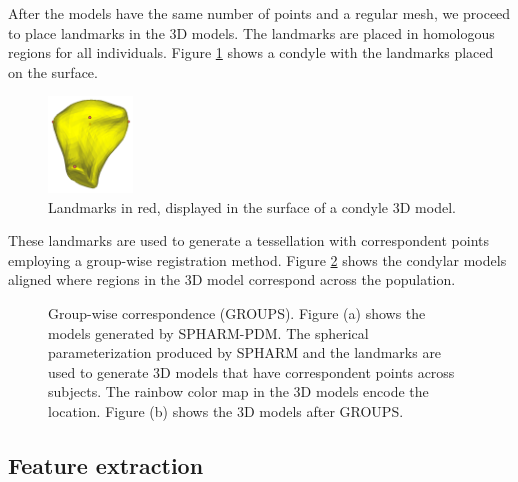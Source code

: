 \documentclass[]{spie}  %
\begin{document}
After the models have the same number of points and a regular mesh, we proceed to place landmarks in the 3D models. 
The landmarks are placed in homologous regions for all individuals. Figure \ref{fig:registration} shows a condyle 
with the landmarks placed on the surface. 
\begin{figure}
\centering 
    \label{fig:registration}
    \includegraphics[width=0.2\textwidth]{LandmarksCondyle.png}
    \caption{Landmarks in red, displayed in the surface of a condyle 3D model.}
\end{figure}
These landmarks are used to generate a tessellation with correspondent points 
employing a group-wise registration method\cite{lyu2013group}.
Figure \ref{fig:groups} shows the condylar models aligned where regions in the 3D model correspond across the population.
\begin{figure}
\centering 
    \caption{Group-wise correspondence (GROUPS). Figure (a) shows the models generated by SPHARM-PDM. The spherical parameterization produced by SPHARM and the landmarks are used to generate 3D models that have correspondent points across subjects. The rainbow color map in the 3D models encode the location. Figure (b) shows the 3D models after GROUPS.}
    \label{fig:groups}
\end{figure}

\subsection{Feature extraction}
\end{document}
